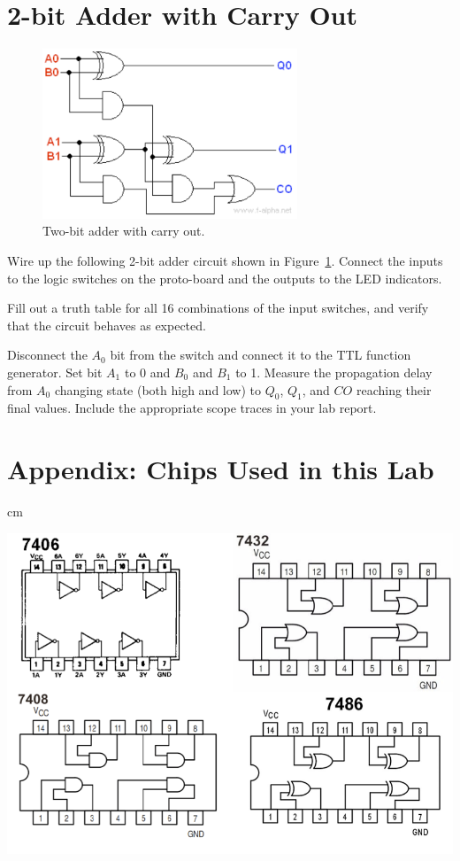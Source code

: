 \documentclass[11pt]{article}
\begin{document}
\section*{2-bit Adder with Carry Out}

\begin{figure}[h!]

\centerline{\includegraphics[width=3in]{figs/adder.png}}
\caption{Two-bit adder with carry out.}
\label{fig:adder}
\end{figure}


Wire up the following 2-bit adder circuit shown in Figure~\ref{fig:adder}. Connect the inputs to the logic switches on the proto-board and the outputs to the LED indicators.  


Fill out a truth table for all 16 combinations of the input switches, and verify that the circuit behaves as expected.

Disconnect the $A_0$ bit from the switch and connect it to the TTL function generator.  Set bit $A_1$ to 0 and $B_0$ and $B_1$ to 1.  Measure the propagation delay from $A_0$ changing state (both high and low) to $Q_0$, $Q_1$, and $CO$ reaching their final values.  Include the appropriate scope traces in your lab report.




\section*{Appendix: Chips Used in this Lab}

 cm

\begin{centering}

\includegraphics[width=5 in]{figs/gates.png}

\end{centering}
\end{document}
